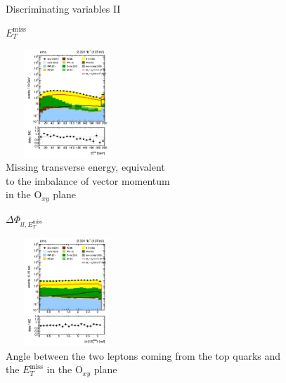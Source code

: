 \documentclass[8 pt]{beamer}
\begin{document}
\begin{frame}{Discriminating variables II}

	\begin{minipage}[c]{.48\linewidth}
	
   	\begin{center}
	\begin{exampleblock}{} { \begin{center} \vspace{0.6pt} $E_T^{\text{miss}}$ \vspace{0.6pt} \end{center}} \end{exampleblock} \vspace{5pt}
	\includegraphics[width= 130pt, height= 115pt]{figs/metPfType1_log-preSel3.png} \\
	Missing transverse energy, equivalent \\ to the imbalance of vector momentum \\ in the O$_{xy}$ plane
	\end{center}
	
	\end{minipage}
	\hspace{5pt}
	 \begin{minipage}[c]{.48\linewidth}
   	
	\begin{center}
	\begin{exampleblock}{} { \begin{center} $\Delta \Phi_{ll, E_T^{\text{miss}}}$ \end{center}} \end{exampleblock} \vspace{5pt}
	\includegraphics[width= 130pt, height= 115pt]{figs/dphillmet_log-preSel3.png} \\
	Angle between the two leptons coming from the top quarks and \\ the $E_T^{\text{miss}}$ in the O$_{xy}$ plane
	\end{center}
	

\end{minipage}
\end{frame}
\end{document}
